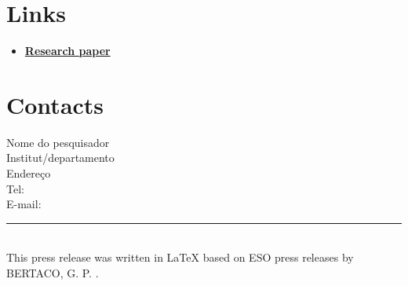 \documentclass{article}
\begin{document}
\section*{\LARGE Links}
\begin{itemize}[label=$\bullet$] 
    \item \textbf{\href{https:seu-link-aqui.com}{Research paper}} 
\end{itemize}

\section*{\LARGE Contacts}

Nome do pesquisador\\
Institut/departamento \ \\
Endereço \\
Tel: \\
E-mail: 


\begin{flushleft}
    \rule{6cm}{0.5pt}\\
    {\footnotesize{This press release was written in \LaTeX{} based on ESO press releases by BERTACO, G. P. .}}
\end{flushleft}
\end{document}
